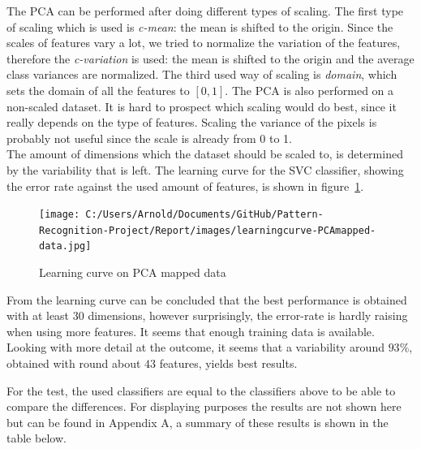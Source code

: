 \documentclass{article}
\begin{document}
The PCA can be performed after doing different types of scaling. The first type of scaling which is used is \emph{c-mean}: the mean is shifted to the origin. Since the scales of features vary a lot, we tried to normalize the variation of the features, therefore the \emph{c-variation} is used: the mean is shifted to the origin and the average class variances are normalized. The third used way of scaling is \emph{domain}, which sets the domain of all the features to $[0, 1]$. The PCA is also performed on a non-scaled dataset. It is hard to prospect which scaling would do best, since it really depends on the type of features. Scaling the variance of the pixels is probably not useful since the scale is already from 0 to 1. \\

The amount of dimensions which the dataset should be scaled to, is determined by the variability that is left. The learning curve for the SVC classifier, showing the error rate against the used amount of features, is shown in figure~\ref{fig:learningcurve-PCAmapped-data}.

\begin{figure}[H]
	\centering
		\texttt{[image: C:/Users/Arnold/Documents/GitHub/Pattern-Recognition-Project/Report/images/learningcurve-PCAmapped-data.jpg]}
	\caption{Learning curve on PCA mapped data}
	\label{fig:learningcurve-PCAmapped-data}
\end{figure}

From the learning curve can be concluded that the best performance is obtained with at least $30$ dimensions, however surprisingly, the error-rate is hardly raising when using more features. It seems that enough training data is available. Looking with more detail at the outcome, it seems that a variability around $93 \%$, obtained with round about $43$ features, yields best results. 

For the test, the used classifiers are equal to the classifiers above to be able to compare the differences. For displaying purposes the results are not shown here but can be found in Appendix A, a summary of these results is shown in the table below.
\end{document}
